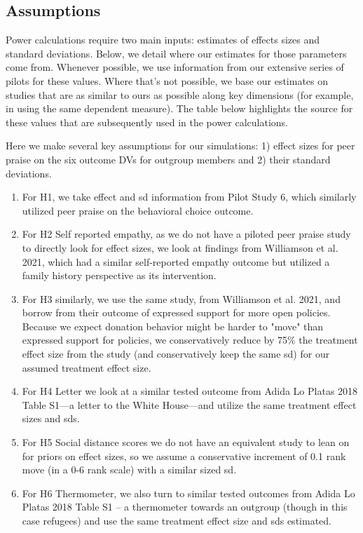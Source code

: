 \documentclass[
]{article}
\begin{document}
\hypertarget{assumptions}{%
\subsection{Assumptions}\label{assumptions}}

Power calculations require two main inputs: estimates of effects sizes
and standard deviations. Below, we detail where our estimates for those
parameters come from. Whenever possible, we use information from our
extensive series of pilots for these values. Where that's not possible,
we base our estimates on studies that are as similar to ours as possible
along key dimensions (for example, in using the same dependent measure).
The table below highlights the source for these values that are
subsequently used in the power calculations.

Here we make several key assumptions for our simulations: 1) effect
sizes for peer praise on the six outcome DVs for outgroup members and 2)
their standard deviations.

\begin{enumerate}
\item For H1, we take effect and sd information from Pilot Study 6, which similarly utilized peer praise on the behavioral choice outcome. 
\item For H2 Self reported empathy, as we do not have a piloted peer praise study to directly look for effect sizes, we look at findings from Williamson et al. 2021, which had a similar self-reported empathy outcome but utilized a family history perspective as its intervention.
\item For H3 similarly, we use the same study, from Williamson et al. 2021, and borrow from their outcome of expressed support for more open policies. Because we expect donation behavior might be harder to "move" than expressed support for policies, we conservatively reduce by 75\% the treatment effect size from the study (and conservatively keep the same sd) for our assumed treatment effect size.
\item For H4 Letter we look at a similar tested outcome from Adida Lo Platas 2018 Table S1---a letter to the White House---and utilize the same treatment effect sizes and sds. 
\item For H5 Social distance scores we do not have an equivalent study to lean on for priors on effect sizes, so we assume a conservative increment of 0.1 rank move (in a 0-6 rank scale) with a similar sized sd.
\item For H6 Thermometer, we also turn to similar tested outcomes from Adida Lo Platas 2018 Table S1 -- a thermometer towards an outgroup (though in this case refugees) and use the same treatment effect size and sds estimated.
\end{enumerate}
\end{document}
